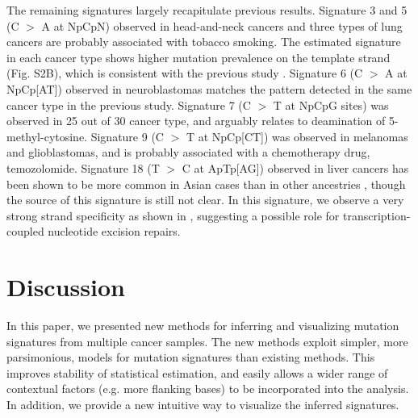 \documentclass[10pt,letterpaper]{article}
\begin{document}
The remaining signatures largely recapitulate previous results.
Signature 3 and 5 (C $>$ A at NpCpN) observed in head-and-neck cancers and three types of lung cancers are probably associated with tobacco smoking.
The estimated signature in each cancer type shows higher mutation prevalence on the template strand (Fig. S2B), 
which is consistent with the previous study \cite{pmid12379884, pmid23318258}.
Signature 6 (C $>$ A at NpCp[AT]) observed in neuroblastomas matches the pattern detected in the same cancer type in the previous study.
Signature 7 (C $>$ T at NpCpG sites) was observed in 25 out of 30 cancer type, and arguably relates to deamination of 5-methyl-cytosine.
Signature 9 (C $>$ T at NpCp[CT]) was observed in melanomas and glioblastomas, and is probably associated with a chemotherapy drug, temozolomide.
Signature 18 (T $>$ C at ApTp[AG]) observed in liver cancers has been shown to be more common in Asian cases than in other ancestries \cite{pmid25362482}, 
though the source of this signature is still not clear. 
In this signature, we observe a very strong strand specificity as shown in \cite{pmid25362482, pmid23318258},
suggesting a possible role for transcription-coupled nucleotide excision repairs.
 



\section*{Discussion}

In this paper, we presented new methods for inferring and visualizing mutation signatures from multiple cancer samples.
The new methods exploit simpler, more parsimonious, models
for mutation signatures than existing methods.
This improves stability of statistical estimation, and easily allows
a wider range of contextual factors (e.g. more flanking bases) to be
incorporated into the analysis. In addition, we provide a new
intuitive way to visualize the inferred signatures.
\end{document}
